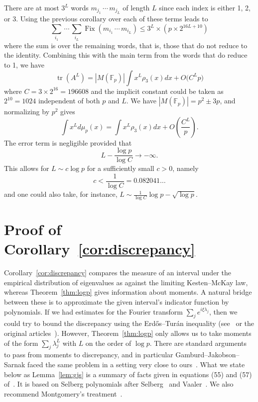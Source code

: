 \documentclass[AHL, Unicode, longabstracts, published]{cedram}
\newcommand{\F}{\mathbb{F}}
\DeclareMathOperator{\tr}{tr}
\DeclareMathOperator{\Fix}{Fix}
\begin{document}
There are at most $3^L$ words $m_{j_1}\,\cdots\, m_{j_L}$ of length $L$ since each index is either 1, 2, or 3. Using the previous corollary over each of these terms leads to
\[
\sum_{i_1}\,\cdots\,\sum_{i_L} \Fix(m_{i_1}\,\cdots\, m_{i_L}) \leq 3^L \times \left(p \times 2^{16L+10}\right)
\]
where the sum is over the remaining words, that is, those that do not reduce to the identity. Combining this with the main term from the words that do reduce to 1, we have
\[
\tr \left(A^L\right) = |M(\F_p)| \int x^L \rho_3(x) dx + O\big(C^L p \big)
\]
where $C=3 \times 2^{16} = 196608$ and the implicit constant could be taken as $2^{10}=1024$ independent of both $p$ and $L$. We have $|M(\F_p)| = p^2 \pm 3p$, and normalizing by $p^2$ gives
\[
\int x^L d\mu_p(x) = \int x^L \rho_3(x) dx + O\left(\frac{C^L }{p} \right).
\]
The error term is negligible provided that
\[
L - \frac{\log{p}}{\log{C} } \rightarrow - \infty.
\]
This allows for $L \sim c\log{p}$ for a sufficiently small $c > 0$, namely
\[
c < \frac{1}{\log{C} } = 0.082041\ldots
\]
and one could also take, for instance, $L \sim \frac{1}{\log{C}} \log{p} - \sqrt{\log{p}}$.

\section{Proof of Corollary~\ref{cor:discrepancy}} \label{sec:discrepancy}

Corollary~\ref{cor:discrepancy} compares the measure of an interval under the empirical distribution of eigenvalues as against the limiting Kesten--McKay law, whereas Theorem~\ref{thm:logp} gives information about moments. A natural bridge between these is to approximate the given interval's indicator function by polynomials. If we had estimates for the Fourier transform $\sum_j e^{i \xi \lambda_j}$, then we could try to bound the discrepancy using the Erd\H{o}s\linebreak--Turán inequality (see~\cite[Corollary~1.1]{Mon} or the original articles~\cite{ET1, ET2}). However, Theorem~\ref{thm:logp} only allows us to take moments of the form $\sum_j \lambda_j^L$ with $L$ on the order of $\log{p}$. There are standard arguments to pass from moments to discrepancy, and in particular Gamburd--Jakobson--Sarnak faced the same problem in a setting very close to ours~\cite{GJS}. What we state below as Lemma~\ref{lem:gjs} is a summary of facts given in equations (55) and (57) of~\cite[Proof of Theorem~1.3]{GJS}. It is based on Selberg polynomials after Selberg~\cite[p.~213--219]{S} and Vaaler~\cite{V}. We also recommend Montgomery's treatment~\cite[p.~5--15]{Mon}.
\end{document}
